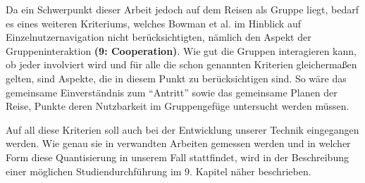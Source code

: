 Da ein Schwerpunkt dieser Arbeit jedoch auf dem Reisen als Gruppe liegt, bedarf es eines weiteren Kriteriums, welches Bowman et al. im Hinblick auf Einzelnutzernavigation nicht berücksichtigten, nämlich den Aspekt der Gruppeninteraktion \textbf{(9: Cooperation)}. Wie gut die Gruppen interagieren kann, ob jeder involviert wird und für alle die schon genannten Kriterien gleichermaßen gelten, sind Aspekte, die in diesem Punkt zu berücksichtigen sind.
So wäre das gemeinsame Einverständnis zum “Antritt” sowie das gemeinsame Planen der Reise, Punkte deren Nutzbarkeit im Gruppengefüge untersucht werden müssen.

Auf all diese Kriterien soll auch bei der Entwicklung unserer Technik eingegangen werden. Wie genau sie in verwandten Arbeiten gemessen werden und in welcher Form diese Quantisierung in unserem Fall stattfindet, wird in der Beschreibung einer möglichen Studiendurchführung im 9. Kapitel näher beschrieben.